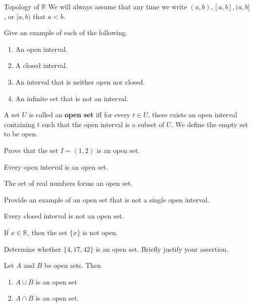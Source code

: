 \begin{section}{Topology of $\mathbb{R}$}
We will always assume that any time we write $(a,b), [a,b], (a,b]$, or $[a,b)$ that $a<b$. 

\begin{exercise} Give an example of each of the following.
\begin{enumerate}[label=\textrm{(\alph*)}]
\item An open interval.
\item A closed interval.
\item An interval that is neither open nor closed.
\item An infinite set that is not an interval.
\end{enumerate}
\end{exercise}

\begin{definition}
A set $U$ is called an \textbf{open set} iff for every $t \in U$, there exists an open interval containing $t$ such that the open interval is a subset of $U$.  We define the empty set to be open.\end{definition}

\begin{problem} 
Prove that the set $I=(1,2)$ is an open set.
\end{problem}

\begin{theorem}
Every open interval is an open set. 
\end{theorem}

\begin{theorem}
The set of real numbers forms an open set.
\end{theorem}

\begin{exercise}
Provide an example of an open set that is not a single open interval.
\end{exercise}

\begin{theorem}
Every closed interval is not an open set.
\end{theorem}

\begin{theorem}
If $x\in\mathbb{R}$, then the set $\{x\}$ is not open.
\end{theorem}

\begin{exercise} 
Determine whether $\{4,17,42\}$ is an open set. Briefly justify your assertion. 
\end{exercise}

\begin{theorem}\label{finite union of open sets}
Let $A$ and $B$ be open sets.  Then 
\begin{enumerate}[label=\textrm{(\alph*)}]
\item $A\cup B$ is an open set
\item $A\cap B$ is an open set.
\end{enumerate}
\end{theorem}


\end{section}
